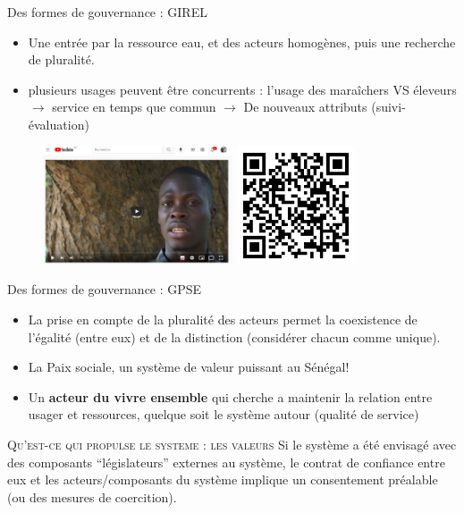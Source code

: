 \documentclass[newPxFont]{beamer}
\begin{document}
      
  \begin{frame}[c]{Des formes de gouvernance : GIREL}
      \vspace{-1cm}
      \begin{itemize}
          \item Une entrée par la ressource eau, et des acteurs homogènes, puis une recherche de pluralité.
          \item plusieurs usages peuvent être concurrents : l’usage des maraîchers VS éleveurs $\rightarrow$ service en temps que commun $\rightarrow$ De nouveaux attributs (suivi-évaluation)
      \end{itemize}
      \begin{figure}
          \includegraphics[height=3.5cm]{img/ComMod_f'eauDiem.png}
          \includegraphics[height=3.5cm]{img/qrcode_feaudiem.png}
      \end{figure}
      
      \end{frame}
      
      \begin{frame}[c]{Des formes de gouvernance : GPSE}
      \vspace{-1cm}
      \begin{itemize}
          \item La prise en compte de la pluralité des acteurs permet la coexistence de l’égalité (entre eux) et de la distinction (considérer chacun comme unique).
          \item La Paix sociale, un système de valeur puissant au Sénégal!
          \item Un \textbf{acteur du vivre ensemble} qui cherche a maintenir la relation entre usager et ressources, quelque soit le système autour (qualité de service)
      \end{itemize}
       \small{
         \begin{alertblock}{\textsc{Qu'est-ce qui propulse le systeme : les valeurs }}
          Si le système a été envisagé avec des composants “législateurs” externes au système, le contrat de confiance entre eux et les acteurs/composants du système implique un consentement préalable (ou des mesures de coercition).
         \end{alertblock}
       }
      \end{frame}
\end{document}
